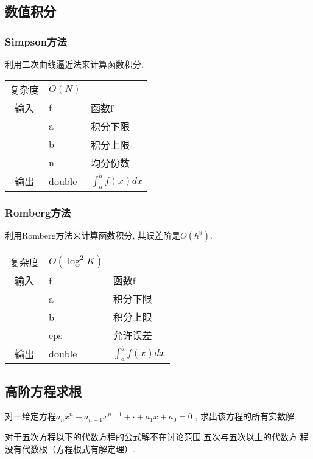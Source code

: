     \subsection{数值积分}\small
        \subsubsection{Simpson方法}\small
利用二次曲线逼近法来计算函数积分.

\begin{longtable}{|c|l|l|}
复杂度 & $O(N)$ &  \\
输入 & f & 函数f \\
 & a & 积分下限 \\
 & b & 积分上限 \\
 & n & 均分份数 \\ 
输出 & double & $\int_{a} ^{b} f(x)  dx$ \\ 
\end{longtable}



        \subsubsection{Romberg方法}\small
利用Romberg方法来计算函数积分, 其误差阶是$O(h^8)$.

\begin{longtable}{|c|l|l|}
复杂度 & $O({\log}^{2} K)$ &  \\
输入 & f & 函数f \\
 & a & 积分下限 \\
 & b & 积分上限 \\
 & eps & 允许误差 \\ 
输出 & double & $\int_{a} ^{b} f(x)  dx$ \\ 
\end{longtable}



    \subsection{高阶方程求根}\small
对一给定方程$a_{n}x^{n} + a_{n-1}x^{n-1} + \cdot + a_{1}x + a_{0} = 0$
, 求出该方程的所有实数解.

对于五次方程以下的代数方程的公式解不在讨论范围.五次与五次以上的代数方
程没有代数根（方程根式有解定理）.

